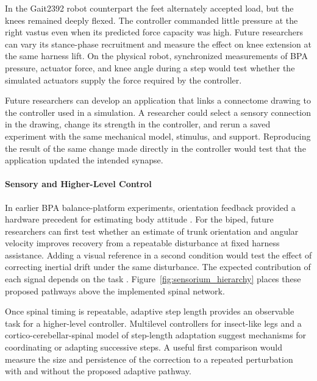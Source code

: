 In the Gait2392 robot counterpart the feet alternately accepted load, but the knees remained deeply flexed. The controller commanded little pressure at the right vastus even when its predicted force capacity was high. Future researchers can vary its stance-phase recruitment and measure the effect on knee extension at the same harness lift. On the physical robot, synchronized measurements of BPA pressure, actuator force, and knee angle during a step would test whether the simulated actuators supply the force required by the controller.

Future researchers can develop an application that links a connectome drawing to the controller used in a simulation. A researcher could select a sensory connection in the drawing, change its strength in the controller, and rerun a saved experiment with the same mechanical model, stimulus, and support. Reproducing the result of the same change made directly in the controller would test that the application updated the intended synapse.

\paragraph{Sensory and Higher-Level Control}\label{sec:fw_senses}

In earlier BPA balance-platform experiments, orientation feedback provided a hardware precedent for estimating body attitude \citep{hilts_dynamic_2019,bolen_balance_2024,bolen_selfbalancing_2024,bolen_selfbalancing_srs_2024}. For the biped, future researchers can first test whether an estimate of trunk orientation and angular velocity improves recovery from a repeatable disturbance at fixed harness assistance. Adding a visual reference in a second condition would test the effect of correcting inertial drift under the same disturbance. The expected contribution of each signal depends on the task \citep{akay_relative_2021}. Figure~\ref{fig:sensorium_hierarchy} places these proposed pathways above the implemented spinal network.

Once spinal timing is repeatable, adaptive step length provides an observable task for a higher-level controller. Multilevel controllers for insect-like legs \citep{grummer_multilevel_2024} and a cortico-cerebellar-spinal model of step-length adaptation \citep{chen_corticocerebellar_2025} suggest mechanisms for coordinating or adapting successive steps. A useful first comparison would measure the size and persistence of the correction to a repeated perturbation with and without the proposed adaptive pathway.

